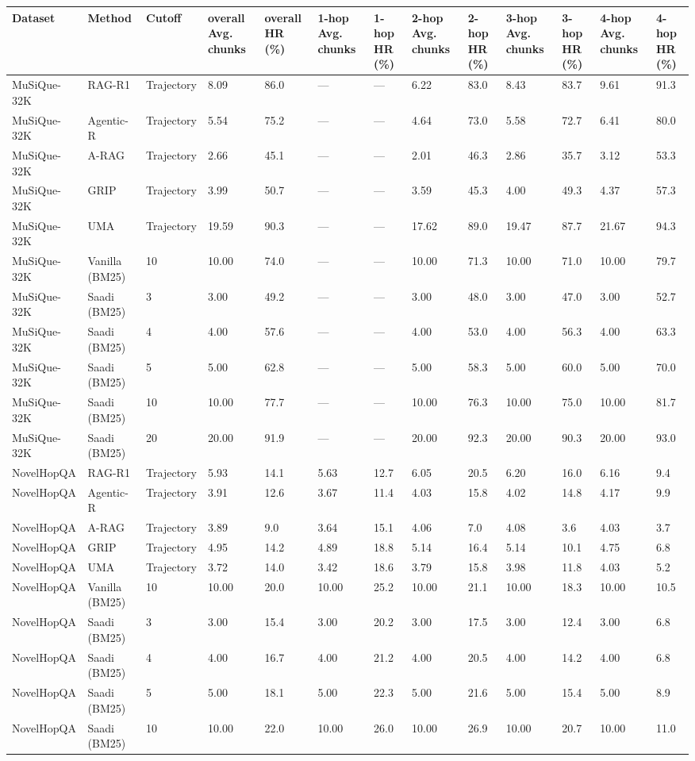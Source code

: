 \begin{tabular}{lllllllllllll}
\hline
Dataset & Method & Cutoff & overall Avg. chunks & overall HR (\%) & 1-hop Avg. chunks & 1-hop HR (\%) & 2-hop Avg. chunks & 2-hop HR (\%) & 3-hop Avg. chunks & 3-hop HR (\%) & 4-hop Avg. chunks & 4-hop HR (\%) \\
\hline
MuSiQue-32K & RAG-R1 & Trajectory & 8.09 & 86.0 & — & — & 6.22 & 83.0 & 8.43 & 83.7 & 9.61 & 91.3 \\
MuSiQue-32K & Agentic-R & Trajectory & 5.54 & 75.2 & — & — & 4.64 & 73.0 & 5.58 & 72.7 & 6.41 & 80.0 \\
MuSiQue-32K & A-RAG & Trajectory & 2.66 & 45.1 & — & — & 2.01 & 46.3 & 2.86 & 35.7 & 3.12 & 53.3 \\
MuSiQue-32K & GRIP & Trajectory & 3.99 & 50.7 & — & — & 3.59 & 45.3 & 4.00 & 49.3 & 4.37 & 57.3 \\
MuSiQue-32K & UMA & Trajectory & 19.59 & 90.3 & — & — & 17.62 & 89.0 & 19.47 & 87.7 & 21.67 & 94.3 \\
MuSiQue-32K & Vanilla (BM25) & 10 & 10.00 & 74.0 & — & — & 10.00 & 71.3 & 10.00 & 71.0 & 10.00 & 79.7 \\
MuSiQue-32K & Saadi (BM25) & 3 & 3.00 & 49.2 & — & — & 3.00 & 48.0 & 3.00 & 47.0 & 3.00 & 52.7 \\
MuSiQue-32K & Saadi (BM25) & 4 & 4.00 & 57.6 & — & — & 4.00 & 53.0 & 4.00 & 56.3 & 4.00 & 63.3 \\
MuSiQue-32K & Saadi (BM25) & 5 & 5.00 & 62.8 & — & — & 5.00 & 58.3 & 5.00 & 60.0 & 5.00 & 70.0 \\
MuSiQue-32K & Saadi (BM25) & 10 & 10.00 & 77.7 & — & — & 10.00 & 76.3 & 10.00 & 75.0 & 10.00 & 81.7 \\
MuSiQue-32K & Saadi (BM25) & 20 & 20.00 & 91.9 & — & — & 20.00 & 92.3 & 20.00 & 90.3 & 20.00 & 93.0 \\
NovelHopQA & RAG-R1 & Trajectory & 5.93 & 14.1 & 5.63 & 12.7 & 6.05 & 20.5 & 6.20 & 16.0 & 6.16 & 9.4 \\
NovelHopQA & Agentic-R & Trajectory & 3.91 & 12.6 & 3.67 & 11.4 & 4.03 & 15.8 & 4.02 & 14.8 & 4.17 & 9.9 \\
NovelHopQA & A-RAG & Trajectory & 3.89 & 9.0 & 3.64 & 15.1 & 4.06 & 7.0 & 4.08 & 3.6 & 4.03 & 3.7 \\
NovelHopQA & GRIP & Trajectory & 4.95 & 14.2 & 4.89 & 18.8 & 5.14 & 16.4 & 5.14 & 10.1 & 4.75 & 6.8 \\
NovelHopQA & UMA & Trajectory & 3.72 & 14.0 & 3.42 & 18.6 & 3.79 & 15.8 & 3.98 & 11.8 & 4.03 & 5.2 \\
NovelHopQA & Vanilla (BM25) & 10 & 10.00 & 20.0 & 10.00 & 25.2 & 10.00 & 21.1 & 10.00 & 18.3 & 10.00 & 10.5 \\
NovelHopQA & Saadi (BM25) & 3 & 3.00 & 15.4 & 3.00 & 20.2 & 3.00 & 17.5 & 3.00 & 12.4 & 3.00 & 6.8 \\
NovelHopQA & Saadi (BM25) & 4 & 4.00 & 16.7 & 4.00 & 21.2 & 4.00 & 20.5 & 4.00 & 14.2 & 4.00 & 6.8 \\
NovelHopQA & Saadi (BM25) & 5 & 5.00 & 18.1 & 5.00 & 22.3 & 5.00 & 21.6 & 5.00 & 15.4 & 5.00 & 8.9 \\
NovelHopQA & Saadi (BM25) & 10 & 10.00 & 22.0 & 10.00 & 26.0 & 10.00 & 26.9 & 10.00 & 20.7 & 10.00 & 11.0 \\
\hline
\end{tabular}
